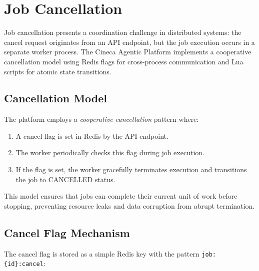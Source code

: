 
\section{Job Cancellation}
\label{sec:job-cancellation}

Job cancellation presents a coordination challenge in distributed systems: the cancel request originates from an API endpoint, but the job execution occurs in a separate worker process. The Cineca Agentic Platform implements a cooperative cancellation model using Redis flags for cross-process communication and Lua scripts for atomic state transitions.

\subsection{Cancellation Model}

The platform employs a \textit{cooperative cancellation} pattern where:

\begin{enumerate}
    \item A cancel flag is set in Redis by the API endpoint.
    \item The worker periodically checks this flag during job execution.
    \item If the flag is set, the worker gracefully terminates execution and transitions the job to CANCELLED status.
\end{enumerate}

This model ensures that jobs can complete their current unit of work before stopping, preventing resource leaks and data corruption from abrupt termination.

\subsection{Cancel Flag Mechanism}

The cancel flag is stored as a simple Redis key with the pattern \texttt{job:\{id\}:cancel}:

